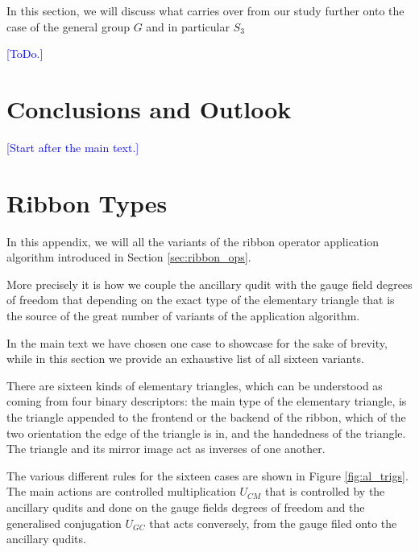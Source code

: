 \documentclass[two column]{article}
\newcommand{\jovan}[1]{\textcolor{blue}{[#1]}}
\begin{document}
In this section, we will discuss what carries over from our study further onto the case of the general group $G$ and in particular $S_3$

\jovan{ToDo.}



\section{Conclusions and Outlook}

\jovan{Start after the main text.}




\FloatBarrier
\onecolumn
\appendix

\section{Ribbon Types}\label{app:ribs}


In this appendix, we will all the variants of the ribbon operator application algorithm introduced in Section \ref{sec:ribbon_ops}.

More precisely it is how we couple the ancillary qudit with the gauge field degrees of freedom that depending on the exact type of the elementary triangle that is the source of the great number of variants of the application algorithm. 

In the main text we have chosen one case to showcase for the sake of brevity, while in this section we provide an exhaustive list of all sixteen variants.

There are sixteen kinds of elementary triangles, which can be understood as coming from four binary descriptors: the main type of the elementary triangle, is the triangle appended to the frontend or the backend of the ribbon, which of the two orientation the edge of the triangle is in, and the handedness of the triangle. The triangle and its mirror image act as inverses of one another.

The various different rules for the sixteen cases are shown in Figure \ref{fig:al_trigs}. The main actions are controlled multiplication $U_{CM}$ that is controlled by the ancillary qudits and done on the gauge fields degrees of freedom and the generalised conjugation $U_{GC}$ that acts conversely, from the gauge filed onto the ancillary qudits.
\end{document}
